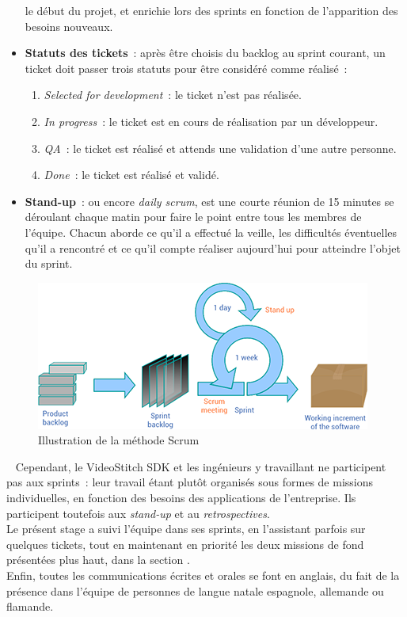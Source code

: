 \begin{itemize}
  le début du projet, et enrichie lors des sprints en fonction de l'apparition des besoins nouveaux.
  \item \textbf{Statuts des tickets}~: après être choisis du backlog au sprint courant, 
  un ticket doit passer trois statuts pour être considéré comme réalisé~:
    \begin{enumerate}
      \item \textit{Selected for development}~: le ticket n'est pas réalisée.
      \item \textit{In progress}~: le ticket est en cours de réalisation par un développeur.
      \item \textit{QA}~: le ticket est réalisé et attends une validation d'une autre personne.
      \item \textit{Done}~: le ticket est réalisé et validé. 
    \end{enumerate}
  \item \textbf{Stand-up}~: \label{stand-up} ou encore \textit{daily scrum}, est une courte réunion de 15 minutes
  se déroulant chaque matin pour faire le point entre tous les membres de l'équipe.
  Chacun aborde ce qu'il a effectué la veille, les difficultés éventuelles qu'il
  a rencontré et ce qu'il compte réaliser aujourd'hui pour atteindre l'objet du sprint.
\end{itemize}
\begin{figure}
  \centering
  \includegraphics[width=11cm]{images/scrum-process.png}
  \caption{Illustration de la méthode Scrum\cite{scrum-process}}
\end{figure}
\ \newline
Cependant, le VideoStitch SDK et les ingénieurs y travaillant ne participent pas
aux sprints~: leur travail étant plutôt organisés sous formes de missions individuelles,
en fonction des besoins des applications de l'entreprise. Ils participent toutefois 
aux \textit{stand-up} et au \textit{retrospectives}.\\
Le présent stage a suivi l'équipe dans ses sprints, en l'assistant parfois sur quelques
tickets, tout en maintenant en priorité les deux missions de fond présentées plus haut, dans 
la section .\\
\newline
Enfin, toutes les communications écrites et orales se font en anglais, du fait
de la présence dans l'équipe de personnes de langue natale espagnole, allemande ou flamande.

